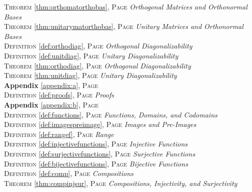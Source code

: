\begin{multicols}{2}
{\textsc{Theorem} \ref{thm:orthomatorthobas}, \textsc{Page} \pageref{thm:orthomatorthobas} \textit{Orthogonal Matrices and Orthonormal Bases} \\
\textsc{Theorem} \ref{thm:unitarymatorthobas}, \textsc{Page} \pageref{thm:unitarymatorthobas} \textit{Unitary Matrices and Orthonormal Bases} \\
\textsc{Definition} \ref{def:orthodiag}, \textsc{Page} \pageref{def:orthodiag} \textit{Orthogonal Diagonalizability} \\
\textsc{Definition} \ref{def:unitdiag}, \textsc{Page} \pageref{def:unitdiag} \textit{Unitary Diagonalizability} \\
\textsc{Theorem} \ref{thm:orthodiag}, \textsc{Page} \pageref{thm:orthodiag} \textit{Orthogonal Diagonalizability} \\
\textsc{Theorem} \ref{thm:unitdiag}, \textsc{Page} \pageref{thm:unitdiag} \textit{Unitary Diagonalizability} \\
\textbf{Appendix} \ref{appendix:a}, \textsc{Page} \pageref{appendix:a} \\
\textsc{Definition} \ref{def:proofs}, \textsc{Page} \pageref{def:proofs} \textit{Proofs} \\
\textbf{Appendix} \ref{appendix:b}, \textsc{Page} \pageref{appendix:b} \\
\textsc{Definition} \ref{def:functions}, \textsc{Page} \pageref{def:functions} \textit{Functions, Domains, and Codomains} \\
\textsc{Definition} \ref{def:imagespreimage}, \textsc{Page} \pageref{def:imagespreimage} \textit{Images and Pre-Images} \\
\textsc{Definition} \ref{def:rangef}, \textsc{Page} \pageref{def:rangef} \textit{Range} \\
\textsc{Definition} \ref{def:injectivefunctions}, \textsc{Page} \pageref{def:injectivefunctions} \textit{Injective Functions} \\
\textsc{Definition} \ref{def:surjectivefunctions}, \textsc{Page} \pageref{def:surjectivefunctions} \textit{Surjective Functions} \\
\textsc{Definition} \ref{def:bijectivefunctions}, \textsc{Page} \pageref{def:bijectivefunctions} \textit{Bijective Functions} \\
\textsc{Definition} \ref{def:comp}, \textsc{Page} \pageref{def:comp} \textit{Compositions} \\
\textsc{Theorem} \ref{thm:compinjsur}, \textsc{Page} \pageref{thm:compinjsur} \textit{Compositions, Injectivity, and Surjectivity} \\
}
\end{multicols}
